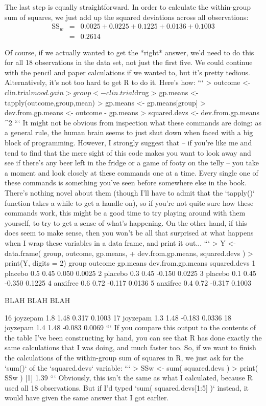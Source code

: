 The last step is equally straightforward. In order to calculate the within-group sum of squares, we just add up  the squared deviations across all observations:
$$
\begin{array}{rcl}
\mbox{SS}_w &=& 0.0025 + 0.0225 + 0.1225 + 0.0136 + 0.1003 \\
&=& 0.2614
\end{array}
$$

Of course, if we actually wanted to get the *right* answer, we'd need to do this for all 18 observations in the data set, not just the first five. We could continue with the pencil and paper calculations if we wanted to, but it's pretty tedious. Alternatively, it's not too hard to get R to do it. Here's how:
```
> outcome <- clin.trial$mood.gain
> group <- clin.trial$drug
> gp.means <- tapply(outcome,group,mean)
> gp.means <- gp.means[group]
> dev.from.gp.means <- outcome - gp.means
> squared.devs <- dev.from.gp.means ^2
```
It might not be obvious from inspection what these commands are doing: as a general rule, the human brain seems to just shut down when faced with a big block of programming. However, I strongly suggest that -- if you're like me and tend to find that the mere sight of this code makes you want to look away and see if there's any beer left in the fridge or a game of footy on the telly -- you take a moment and look closely at these commands one at a time. Every single one of these commands is something you've seen before somewhere else in the book. There's nothing novel about them (though I'll have to admit that the `tapply()` function takes a while to get a handle on), so if you're not quite sure how these commands work, this might be a good time to try playing around with them yourself, to try to get a sense of what's happening. On the other hand, if this does seem to make sense, then you won't be all that surprised at what happens when I wrap these variables in a data frame, and print it out...
```
> Y <- data.frame( group, outcome, gp.means,
+                  dev.from.gp.means, squared.devs )
> print(Y, digits = 2)   
      group outcome gp.means dev.from.gp.means squared.devs
1   placebo     0.5     0.45             0.050       0.0025
2   placebo     0.3     0.45            -0.150       0.0225
3   placebo     0.1     0.45            -0.350       0.1225
4  anxifree     0.6     0.72            -0.117       0.0136
5  anxifree     0.4     0.72            -0.317       0.1003

BLAH BLAH BLAH
      
16 joyzepam     1.8     1.48             0.317       0.1003
17 joyzepam     1.3     1.48            -0.183       0.0336
18 joyzepam     1.4     1.48            -0.083       0.0069
```
If you compare this output to the contents of the table I've been constructing by hand, you can see that R has done exactly the same calculations that I was doing, and much faster too. So, if we want to finish the calculations of the within-group sum of squares in R, we just ask for the `sum()` of the `squared.devs` variable:
```
> SSw <- sum( squared.devs )
> print( SSw )
[1] 1.39
```
Obviously, this isn't the same as what I calculated, because R used all 18 observations. But if I'd typed `sum( squared.devs[1:5] )` instead, it would have given the same answer that I got earlier.

